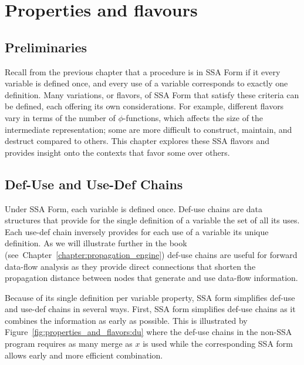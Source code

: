 \chapter{Properties and flavours }
\label{chap:properties_and_flavours}
\graphicspath{{Figs/}{properties_and_flavours/Figs/}{part1/properties_and_flavours/Figs/}}


\section{Preliminaries}

Recall from the previous chapter that a procedure is in SSA Form if it
every variable is defined once, and every use of a variable corresponds
to exactly one definition. Many variations, or flavors, of SSA Form that 
satisfy these criteria can be defined, each offering its own considerations.
For example, different flavors vary in terms of the number of $\phi$-functions,
which affects the size of the intermediate representation; some are more difficult to construct, maintain, and destruct
compared to others. This chapter explores these SSA flavors and provides
insight onto the contexts that favor some over others. 

\section{Def-Use and Use-Def Chains}
Under SSA Form, each variable is defined once. Def-use chains are data structures that provide for the single definition of a variable the set of all its uses. Each use-def chain inversely provides for each use of a variable its unique definition. As we will illustrate further in the book (see~Chapter~\ref{chapter:propagation_engine}) def-use chains are useful for forward data-flow analysis as they provide direct connections that shorten the propagation distance between nodes that generate and use data-flow information. 

Because of its single definition per variable property, SSA form simplifies def-use and use-def chains in several ways. First, SSA form simplifies def-use chains as it combines the information as early as possible.
This is illustrated by Figure~\ref{fig:properties_and_flavors:du} where the def-use chains in the non-SSA program requires as many merge as $x$ is used while the corresponding SSA form allows early and more efficient combination. 

